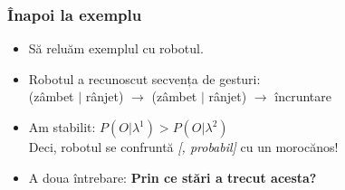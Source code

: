 \begin{frame}
  \frametitle{Înapoi la exemplu}
  \begin{itemize}
  \item Să reluăm exemplul cu robotul.
  \item Robotul a recunoscut secvența de gesturi:\\
      \alert{(zâmbet $\vert$ rânjet)} $\longrightarrow$ \alert{(zâmbet $\vert$ rânjet)} $\longrightarrow$ \alert{încruntare}
  \item Am stabilit:
    $P(O \vert \lambda^{1}) > P(O \vert \lambda^{2})$\pause\\
    Deci, robotul se confruntă \emph{[, probabil]} cu un morocănos!\\
  \item A doua întrebare: \textbf{Prin ce stări a trecut acesta?}
  \end{itemize}
\end{frame}

